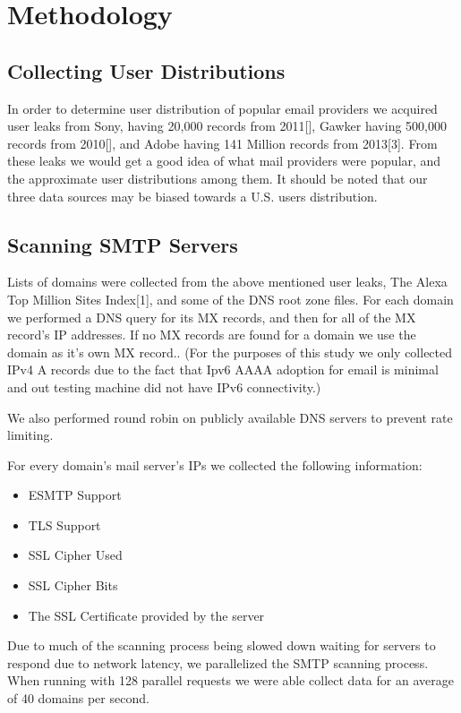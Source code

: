 \section{Methodology}
\subsection{Collecting User Distributions}
In order to determine user distribution of popular email providers we acquired user leaks from Sony, having 20,000 records from 2011[], Gawker having 500,000 records from 2010[], and Adobe having 141 Million records from 2013[3]. From these leaks we would get a good idea of what mail providers were popular, and the approximate user distributions among them. It should be noted that our three data sources may be biased towards a U.S. users distribution.

\subsection{Scanning SMTP Servers}
Lists of domains were collected from the above mentioned user leaks, The Alexa Top Million Sites Index[1], and some of the DNS root zone files. For each domain we performed a DNS query for its MX records, and then for all of the MX record’s IP addresses. If no MX records are found for a domain we use the domain as it’s own MX record.. (For the purposes of this study we only collected IPv4 A records due to the fact that Ipv6 AAAA adoption for email is minimal and out testing machine did not have IPv6 connectivity.)

We also performed round robin on publicly available DNS servers to prevent rate limiting.

For every domain’s mail server’s IPs we collected the following information:
\begin{itemize}
    \item ESMTP Support
    \item TLS Support
    \item SSL Cipher Used
    \item SSL Cipher Bits
    \item The SSL Certificate provided by the server
\end{itemize}

Due to much of the scanning process being slowed down waiting for servers to respond due to network latency, we parallelized the SMTP scanning process. When running with 128 parallel requests we were able collect data for an average of 40 domains per second.

